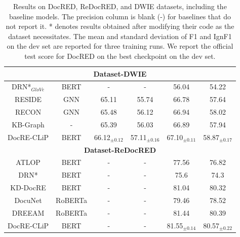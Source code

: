 \documentclass[letterpaper]{article} %
\begin{document}
\begin{table}[ht]
{\begin{tabular}{cccccc}
\hline





\multicolumn{6}{c}{\textbf{Dataset-DWIE}}  \\
\hline
DRN*$_{GloVe}$ & BERT  & - & -  & 56.04  & 54.22 \\


RESIDE & GNN & 65.11& 55.74 & 66.78& 57.64 \\

RECON  & GNN & 65.48& 56.12 & 66.94& 58.02\\

KB-Graph & - & 65.39 & 56.03 & 66.89 &  57.94\\

 {DocRE-CLiP} & BERT &{66.12$_{\pm 0.12}$} & {57.11$_{\pm 0.16}$} & {67.10$_{\pm 0.11}$} & {58.87$_{\pm 0.17}$} \\


\hline
\multicolumn{6}{c}{\textbf{Dataset-ReDocRED}}  \\
\hline

  ATLOP  &  BERT &- & - & 77.56 &  76.82 \\
DRN*  &  BERT & - & - & 75.6 & 74.3 \\


KD-DocRE & BERT &- & - & 81.04 &  80.32\\

DocuNet  & RoBERTa & - & - & 79.46 &  78.52 \\

 DREEAM & RoBERTa &- & - & 81.44 &  80.39\\



 {DocRE-CLiP} & BERT & - & - & {81.55$_{\pm 0.14}$} & {80.57$_{\pm 0.22}$} \\

\hline

\end{tabular}
}
\caption{{Results on DocRED, ReDocRED, and DWIE datasets, including the baseline models. The precision column is blank (-) for baselines that do not report it. * denotes results obtained after modifying their code as the dataset necessitates. The mean and standard deviation of F1 and IgnF1 on the dev set are reported for three training runs. We report the official test score for DocRED on the best checkpoint on the dev set.
}}
    \label{results}
\end{table}
\end{document}

